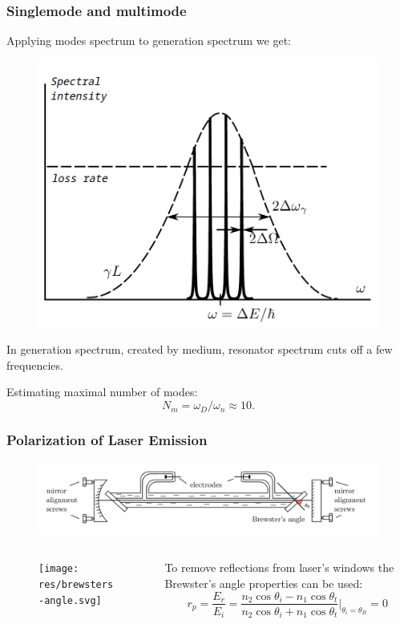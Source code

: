 \documentclass{beamer}
\begin{document}
	\begin{frame}
		\frametitle{Singlemode and multimode}
		
		Applying modes spectrum to generation spectrum we get:
		
		\begin{figure}
			\centering
			\includegraphics[width=0.6\linewidth]{res/overall_spectrum.png}
		\end{figure}
	
		In generation spectrum, created by medium, resonator spectrum cuts off a few frequencies.
		
		Estimating maximal number of modes:
		$$ N_m = \omega_D / \omega_n \approx 10.$$
	\end{frame}

	\begin{frame}
		\frametitle{Polarization of Laser Emission}
		\begin{figure}
			\centering
			\includegraphics[width=1\linewidth]{res/brewster_setup.pdf}
		\end{figure}
		
		\begin{columns}
			\begin{column}{0.3\textwidth}
				\begin{figure}
					\centering
					\texttt{[image: res/brewsters-angle.svg]}
				\end{figure}
			\end{column}
			\begin{column}{0.7\textwidth}
				To remove reflections from laser's windows the Brewster's angle properties can be used:
				$$r_p = \frac{E_r}{E_i} = \frac{n_2 \cos{\theta_i} - n_1 \cos{\theta_t}}{n_2 \cos{\theta_i} + n_1 \cos{\theta_t}}\bigg\rvert_{\theta_i = \theta_B} = 0$$
			\end{column}
		\end{columns}	
	\end{frame}
	
\end{document}
